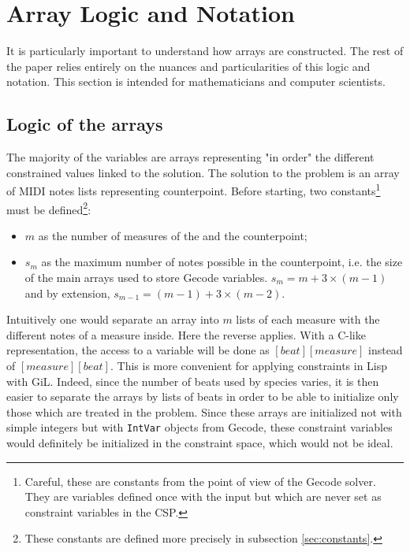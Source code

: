 \section{Array Logic and Notation}\label{sec:arrays}
It is particularly important to understand how arrays are constructed. The rest of the paper relies entirely on the nuances and particularities of this logic and notation. This section is intended for mathematicians and computer scientists. 

\subsection{Logic of the arrays}
The majority of the variables are arrays representing "in order" the different constrained values linked to the solution. The solution to the problem is an array of MIDI notes lists representing counterpoint. Before starting, two constants\footnote{Careful, these are constants from the point of view of the Gecode solver. They are variables defined once with the input but which are never set as constraint variables in the CSP.} must be defined\footnote{These constants are defined more precisely in subsection \ref{sec:constants}.}:

\begin{itemize}
    \item $m$ as the number of measures of the \cf and the counterpoint;
    \item $s_{m}$ as the maximum number of notes possible in the counterpoint, i.e. the size of the main arrays used to store Gecode variables. $s_{m} = m + 3\times (m-1)$ and by extension, $s_{m-1} = (m-1) + 3\times (m-2)$.
\end{itemize}

Intuitively one would separate an array into $m$ lists of each measure with the different notes of a measure inside. Here the reverse applies. With a C-like representation, the access to a variable will be done as $[beat][measure]$ instead of $[measure][beat]$. This is more convenient for applying constraints in Lisp with GiL. Indeed, since the number of beats used by species varies, it is then easier to separate the arrays by lists of beats in order to be able to initialize only those which are treated in the problem. Since these arrays are initialized not with simple integers but with \texttt{IntVar} objects from Gecode, these constraint variables would definitely be initialized in the constraint space, which would not be ideal.\\


